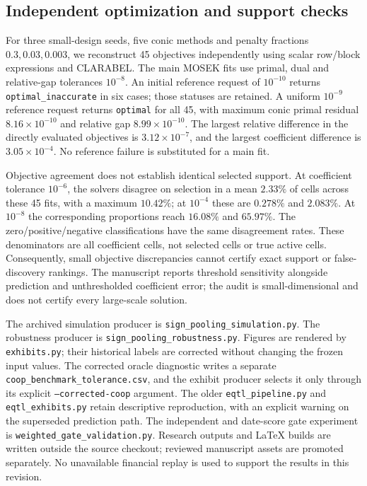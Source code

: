 \documentclass[11pt,a4paper]{article}
\begin{document}
\subsection{Independent optimization and support checks}\label{app:numerical-accuracy}
For three small-design seeds, five conic methods and penalty fractions
$0.3,0.03,0.003$, we reconstruct 45 objectives independently using scalar
row/block expressions and CLARABEL. The main MOSEK fits use primal, dual and
relative-gap tolerances $10^{-8}$. An initial reference request of $10^{-10}$
returns \texttt{optimal\_inaccurate} in six cases; those statuses are retained.
A uniform $10^{-9}$ reference request returns \texttt{optimal} for all 45,
with maximum conic primal residual $8.16\times10^{-10}$ and relative gap
$8.99\times10^{-10}$. The largest relative difference in the directly evaluated
objectives is $3.12\times10^{-7}$, and the largest coefficient difference is
$3.05\times10^{-4}$. No reference failure is substituted for a main fit.

Objective agreement does not establish identical selected support. At coefficient
tolerance $10^{-6}$, the solvers disagree on selection in a mean $2.33\%$ of
cells across these 45 fits, with a maximum $10.42\%$; at $10^{-4}$ these are
$0.278\%$ and $2.083\%$. At $10^{-8}$ the corresponding proportions reach
$16.08\%$ and $65.97\%$. The zero/positive/negative classifications have the
same disagreement rates. These denominators are all coefficient cells, not
selected cells or true active cells. Consequently, small objective discrepancies
cannot certify exact support or false-discovery rankings. The manuscript reports
threshold sensitivity alongside prediction and unthresholded coefficient error;
the audit is small-dimensional and does not certify every large-scale solution.

The archived simulation producer is \nolinkurl{sign_pooling_simulation.py}.
The robustness producer is \nolinkurl{sign_pooling_robustness.py}.
Figures are rendered by \texttt{exhibits.py}; their historical labels are
corrected without changing the frozen input values.
The corrected oracle diagnostic writes a separate
\texttt{coop\_benchmark\_tolerance.csv}, and the exhibit producer selects it
only through its explicit \texttt{--corrected-coop} argument.
The older \nolinkurl{eqtl_pipeline.py} and
\nolinkurl{eqtl_exhibits.py} retain descriptive reproduction, with an explicit
warning on the superseded prediction path. The independent and date-score
gate experiment is \nolinkurl{weighted_gate_validation.py}. Research outputs
and LaTeX builds are written outside the source checkout; reviewed manuscript
assets are promoted separately. No unavailable financial replay is used to
support the results in this revision.
\end{document}
